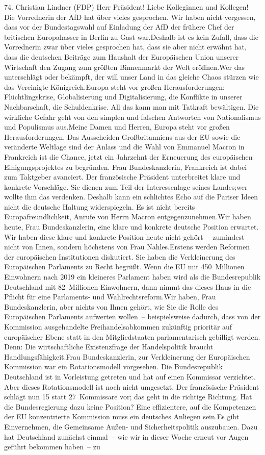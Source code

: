 \documentclass{article}
\begin{document}
	74. Christian Lindner (FDP) Herr Präsident! Liebe Kolleginnen und Kollegen! Die Vorrednerin der AfD hat über vieles gesprochen. Wir haben nicht vergessen, dass vor der Bundestagswahl auf Einladung der AfD der frühere Chef der britischen Europahasser in Berlin zu Gast war.Deshalb ist es kein Zufall, dass die Vorrednerin zwar über vieles gesprochen hat, dass sie aber nicht erwähnt hat, dass die deutschen Beiträge zum Haushalt der Europäischen Union unserer Wirtschaft den Zugang zum größten Binnenmarkt der Welt eröffnen.Wer das unterschlägt oder bekämpft, der will unser Land in das gleiche Chaos stürzen wie das Vereinigte Königreich.Europa steht vor großen Herausforderungen: Flüchtlingskrise, Globalisierung und Digitalisierung, die Konflikte in unserer Nachbarschaft, die Schuldenkrise. All das kann man mit Tatkraft bewältigen. Die wirkliche Gefahr geht von den simplen und falschen Antworten von Nationalismus und Populismus aus.Meine Damen und Herren, Europa steht vor großen Herausforderungen. Das Ausscheiden Großbritanniens aus der EU sowie die veränderte Weltlage sind der Anlass und die Wahl von Emmanuel Macron in Frankreich ist die Chance, jetzt ein Jahrzehnt der Erneuerung des europäischen Einigungsprojektes zu begründen. Frau Bundeskanzlerin, Frankreich ist dabei zum Taktgeber avanciert. Der französische Präsident unterbreitet klare und konkrete Vorschläge. Sie dienen zum Teil der Interessenlage seines Landes;wer wollte ihm das verdenken. Deshalb kann ein schlichtes Echo auf die Pariser Ideen nicht die deutsche Haltung widerspiegeln. Es ist nicht bereits Europafreundlichkeit, Anrufe von Herrn Macron entgegenzunehmen.Wir haben heute, Frau Bundeskanzlerin, eine klare und konkrete deutsche Position erwartet. Wir haben diese klare und konkrete Position heute nicht gehört – zumindest nicht von Ihnen, sondern höchstens von Frau Nahles.Erstens werden Reformen der europäischen Institutionen diskutiert. Sie haben die Verkleinerung des Europäischen Parlaments zu Recht begrüßt. Wenn die EU mit 450 Millionen Einwohnern nach 2019 ein kleineres Parlament haben wird als die Bundesrepublik Deutschland mit 82 Millionen Einwohnern, dann nimmt das dieses Haus in die Pflicht für eine Parlaments- und Wahlrechtsreform.Wir haben, Frau Bundeskanzlerin, aber nichts von Ihnen gehört, wie Sie die Rolle des Europäischen Parlaments aufwerten wollen – beispielsweise dadurch, dass von der Kommission ausgehandelte Freihandelsabkommen zukünftig prioritär auf europäischer Ebene statt in den Mitgliedstaaten parlamentarisch gebilligt werden. Denn: Die wirtschaftliche Existenzfrage der Handelspolitik braucht Handlungsfähigkeit.Frau Bundeskanzlerin, zur Verkleinerung der Europäischen Kommission war ein Rotationsmodell vorgesehen. Die Bundesrepublik Deutschland ist in Vorleistung getreten und hat auf einen Kommissar verzichtet. Aber dieses Rotationsmodell ist noch nicht umgesetzt. Der französische Präsident schlägt nun 15 statt 27 Kommissare vor; das geht in die richtige Richtung. Hat die Bundesregierung dazu keine Position? Eine effizientere, auf die Kompetenzen der EU konzentrierte Kommission muss ein deutsches Anliegen sein.Es gibt Einvernehmen, die Gemeinsame Außen- und Sicherheitspolitik auszubauen. Dazu hat Deutschland zunächst einmal – wie wir in dieser Woche erneut vor Augen geführt bekommen haben – zu 
\end{document}
